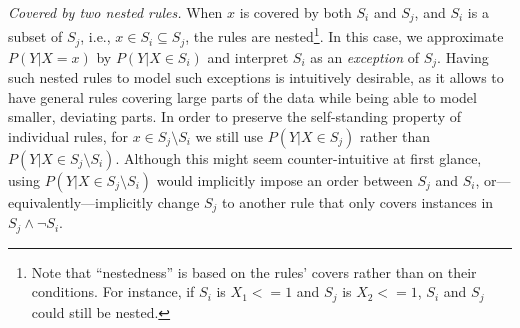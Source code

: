 \smallskip \noindent
\emph{Covered by two nested rules.}
When $x$ is covered by both $S_i$ and $S_j$, and $S_i$ is a subset of $S_j$, i.e., $x \in S_i \subseteq S_j$, the rules are nested\footnote{Note that ``nestedness'' is based on the rules' covers rather than on their conditions. For instance, if $S_i$ is $X_1 <= 1$ and $S_j$ is $X_2 <= 1$, $S_i$ and $S_j$ could still be nested.}.
In this case, we approximate $P(Y|X=x)$ by $P(Y | X \in S_i)$ and interpret $S_i$ as an \emph{exception} of $S_j$. 
Having such nested rules to model such exceptions is intuitively desirable, as it allows to have general rules covering large parts of the data while being able to model smaller, deviating parts. %
In order to preserve the self-standing property of individual rules, for $x \in S_j \setminus S_i$ we still use $P(Y|X \in S_j)$ rather than $P(Y | X \in S_j \setminus S_i)$. Although this might seem counter-intuitive at first glance, using $P(Y | X \in S_j \setminus S_i)$ would implicitly impose an order between $S_j$ and $S_i$, or---equivalently---implicitly change $S_j$ to another rule that only covers instances in $S_j \land \neg S_i$. 
